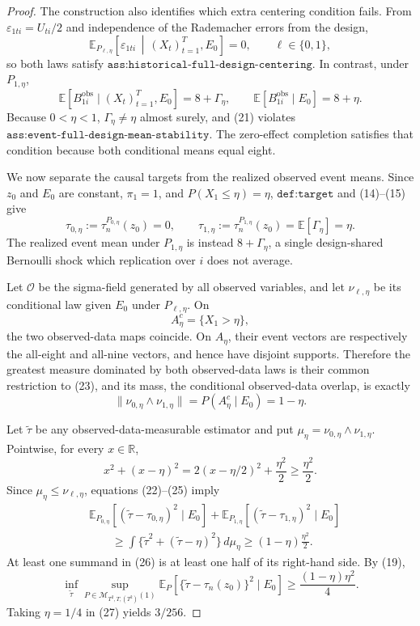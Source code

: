 \documentclass{article}
\begin{document}
\begin{proof}
The construction also identifies which extra centering condition fails.  From \(\varepsilon_{1ti}=U_{ti}/2\) and independence of the Rademacher errors from the design,
\[
\mathbb E_{P_{\ell,\eta}}\!\left[
\varepsilon_{1ti}\,\middle|\,(X_t)_{t=1}^{T},E_0
\right]=0,
\qquad \ell\in\{0,1\},
\tag{20}
\]
so both laws satisfy \(\texttt{ass:historical-full-design-centering}\).  In contrast, under \(P_{1,\eta}\),
\[
\mathbb E[B_{1i}^{\mathrm{obs}}\mid(X_t)_{t=1}^{T},E_0]
=8+\Gamma_\eta,
\qquad
\mathbb E[B_{1i}^{\mathrm{obs}}\mid E_0]=8+\eta.
\tag{21}
\]
Because \(0<\eta<1\), \(\Gamma_\eta\ne\eta\) almost surely, and (21) violates \(\texttt{ass:event-full-design-mean-stability}\).  The zero-effect completion satisfies that condition because both conditional means equal eight.

We now separate the causal targets from the realized observed event means.  Since \(z_0\) and \(E_0\) are constant, \(\pi_1=1\), and \(P(X_1\le\eta)=\eta\), \(\texttt{def:target}\) and (14)--(15) give
\[
\tau_{0,\eta}:=\tau_n^{P_{0,\eta}}(z_0)=0,
\qquad
\tau_{1,\eta}:=\tau_n^{P_{1,\eta}}(z_0)
=\mathbb E[\Gamma_\eta]=\eta.
\tag{22}
\]
The realized event mean under \(P_{1,\eta}\) is instead \(8+\Gamma_\eta\), a single design-shared Bernoulli shock which replication over \(i\) does not average.

Let \(\mathcal O\) be the sigma-field generated by all observed variables, and let \(\nu_{\ell,\eta}\) be its conditional law given \(E_0\) under \(P_{\ell,\eta}\).  On
\[
A_\eta^c=\{X_1>\eta\},
\tag{23}
\]
the two observed-data maps coincide.  On \(A_\eta\), their event vectors are respectively the all-eight and all-nine vectors, and hence have disjoint supports.  Therefore the greatest measure dominated by both observed-data laws is their common restriction to (23), and its mass, the conditional observed-data overlap, is exactly
\[
\|\nu_{0,\eta}\wedge\nu_{1,\eta}\|
=P(A_\eta^c\mid E_0)=1-\eta.
\tag{24}
\]

Let \(\widetilde\tau\) be any observed-data-measurable estimator and put \(\mu_\eta=\nu_{0,\eta}\wedge\nu_{1,\eta}\).  Pointwise, for every \(x\in\mathbb R\),
\[
x^2+(x-\eta)^2
=2(x-\eta/2)^2+\frac{\eta^2}{2}
\ge\frac{\eta^2}{2}.
\tag{25}
\]
Since \(\mu_\eta\le\nu_{\ell,\eta}\), equations (22)--(25) imply
\[
\begin{aligned}
&\mathbb E_{P_{0,\eta}}[(\widetilde\tau-\tau_{0,\eta})^2\mid E_0]
+\mathbb E_{P_{1,\eta}}[(\widetilde\tau-\tau_{1,\eta})^2\mid E_0]\\
&\qquad\ge
\int\{\widetilde\tau^2+(\widetilde\tau-\eta)^2\}\,d\mu_\eta
\ge(1-\eta)\frac{\eta^2}{2}.
\end{aligned}
\tag{26}
\]
At least one summand in (26) is at least one half of its right-hand side.  By (19),
\[
\inf_{\widetilde\tau}
\sup_{P\in\mathcal M_{T^2,T,(T^2)}(1)}
\mathbb E_P[\{\widetilde\tau-\tau_n(z_0)\}^2\mid E_0]
\ge\frac{(1-\eta)\eta^2}{4}.
\tag{27}
\]
Taking \(\eta=1/4\) in (27) yields \(3/256\).


\end{proof}
\end{document}
